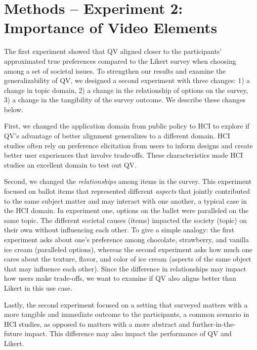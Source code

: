 \section{Methods -- Experiment 2: Importance of Video Elements}
\label{method-2}
The first experiment showed that QV aligned closer to the participants' approximated true preferences compared to the Likert survey when choosing among a set of societal issues. To strengthen our results and examine the generalizability of QV, we designed a second experiment with three changes: 1) a change in topic domain, 2) a change in the relationship of options on the survey, 3) a change in the tangibility of the survey outcome. We describe these changes below.

First, we changed the application domain from public policy to HCI to explore if QV's advantage of better alignment generalizes to a different domain. HCI studies often rely on preference elicitation from users to inform designs and create better user experiences that involve trade-offs. These characteristics made HCI studies an excellent domain to test out QV. 

Second, we changed the \textit{relationships} among items in the survey. This experiment focused on ballot items that represented different \textit{aspects} that jointly contributed to the same subject matter and may interact with one another, a typical case in the HCI domain. In experiment one, options on the ballet were paralleled on the same topic. The different societal causes (items) impacted the society (topic) on their own without influencing each other. To give a simple analogy: the first experiment asks about one's preference among chocolate, strawberry, and vanilla ice cream (paralleled options), whereas the second experiment asks how much one cares about the texture, flavor, and color of ice cream (aspects of the same object that may influence each other). Since the difference in relationships may impact how users make trade-offs, we want to examine if QV also aligns better than Likert in this use case.

Lastly, the second experiment focused on a setting that surveyed matters with a more tangible and immediate outcome to the participants, a common scenario in HCI studies, as opposed to matters with a more abstract and further-in-the-future impact. This difference may also impact the performance of QV and Likert. 

